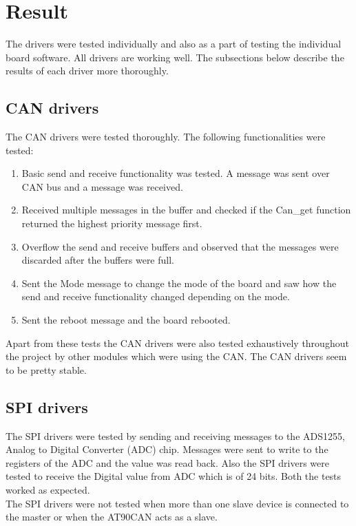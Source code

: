 
\section{Result}\label{sec:result}
The drivers were tested individually and also as a part of testing the individual board software. All drivers are working well. The subsections below describe the results of each driver more thoroughly.


\subsection{CAN drivers}
The CAN drivers were tested thoroughly. The following functionalities were tested:
\begin{enumerate}
\item Basic send and receive functionality was tested. A message was sent over CAN bus and a message was received.
\item Received multiple messages in the buffer and checked if the Can\_get function returned the highest priority message first.
\item Overflow the send and receive buffers and observed that the messages were discarded after the buffers were full.
\item Sent the Mode message to change the mode of the board and saw how the send and receive functionality changed depending on the mode.
\item Sent the reboot message and the board rebooted.
\end{enumerate}
Apart from these tests the CAN drivers were also tested exhaustively throughout the project by other modules which were using the CAN. The CAN drivers seem to be pretty stable.

\subsection{SPI drivers}\label{sec:result_spi}
The SPI drivers were tested by sending and receiving messages to the ADS1255, Analog to Digital Converter (ADC) chip. Messages were sent to write to the registers of the ADC and the value was read back. Also the SPI drivers were tested to receive the Digital value from ADC which is of 24 bits. Both the tests worked as expected. \\
The SPI drivers were not tested when more than one slave device is connected to the master or when the AT90CAN acts as a slave.

